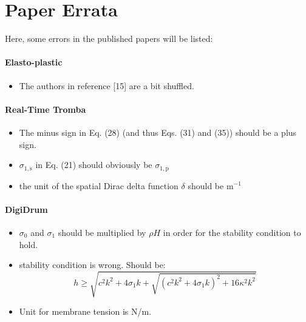 \chapter{Paper Errata}
Here, some errors in the published papers will be listed:
\\
\subsubsection{Elasto-plastic \citeP[C]}
\begin{itemize}
    \item The authors in reference [15] are a bit shuffled.
\end{itemize}
\subsubsection{Real-Time Tromba \citeP[D]}
\begin{itemize}
    \item The minus sign in Eq. (28) (and thus Eqs. (31) and (35)) should be a plus sign.
    \item $\sigma_{1,\text{s}}$ in Eq. (21) should obviously be $\sigma_{1,\text{p}}$
    \item the unit of the spatial Dirac delta function $\delta$ should be m$^{-1}$
\end{itemize}
%
\subsubsection{DigiDrum \citeP[F]}
\begin{itemize}
    \item $\sigma_0$ and $\sigma_1$ should be multiplied by $\rho H$ in order for the stability condition to hold.
    \item stability condition is wrong. Should be: 
    \begin{equation}
        h \geq \sqrt{c^2k^2 + 4\sigma_1k + \sqrt{(c^2k^2+4\sigma_1k)^2 + 16\kappa^2k^2}}
    \end{equation}
    \item Unit for membrane tension is N/m.
\end{itemize}
